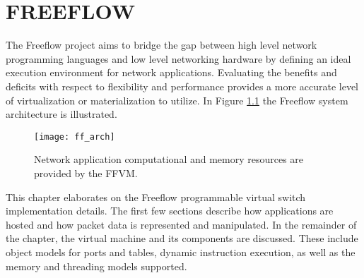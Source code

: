 \chapter{FREEFLOW}
\label{ff}
The Freeflow project aims to bridge the gap between high level network
programming languages and low level networking hardware by defining an ideal
execution environment for network applications. Evaluating the benefits and
deficits with respect to flexibility and performance provides a more accurate
level of virtualization or materialization to utilize. In Figure \ref{ff_arch}
the Freeflow system architecture is illustrated.

\begin{figure}[h]
\centering
\texttt{[image: ff\_arch]}
\caption{Network application computational and memory resources are provided
by the FFVM.}
\label{ff_arch}
\end{figure}

This chapter elaborates on the Freeflow programmable virtual switch
implementation details. The first few sections describe how applications are
hosted and how packet data is represented and manipulated. In the remainder of
the chapter, the virtual machine and its components are discussed. These include
object models for ports and tables, dynamic instruction execution, as well as
the memory and threading models supported.

%
%

